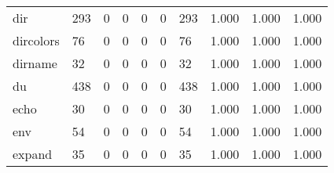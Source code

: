 \begin{longtable}{lp{2.0cm}p{2.0cm}p{2.0cm}p{2.0cm}p{2.0cm}p{2.0cm}p{2.0cm}p{2.0cm}p{2.0cm}}
dir       &                    293 &                                             0 &                                            0 &                                           0 &                                            0 &                                        293 &                                1.000 &                                  1.000 &                                1.000 \\
dircolors &                     76 &                                             0 &                                            0 &                                           0 &                                            0 &                                         76 &                                1.000 &                                  1.000 &                                1.000 \\
dirname   &                     32 &                                             0 &                                            0 &                                           0 &                                            0 &                                         32 &                                1.000 &                                  1.000 &                                1.000 \\
du        &                    438 &                                             0 &                                            0 &                                           0 &                                            0 &                                        438 &                                1.000 &                                  1.000 &                                1.000 \\
echo      &                     30 &                                             0 &                                            0 &                                           0 &                                            0 &                                         30 &                                1.000 &                                  1.000 &                                1.000 \\
env       &                     54 &                                             0 &                                            0 &                                           0 &                                            0 &                                         54 &                                1.000 &                                  1.000 &                                1.000 \\
expand    &                     35 &                                             0 &                                            0 &                                           0 &                                            0 &                                         35 &                                1.000 &                                  1.000 &                                1.000 \\

\end{longtable}
